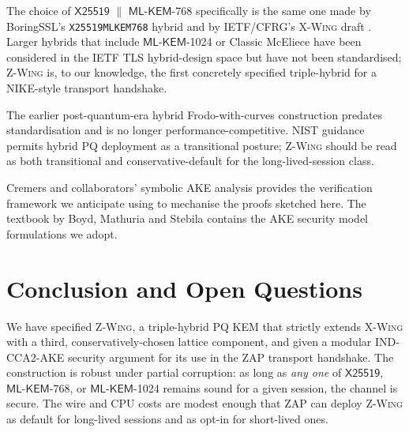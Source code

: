 \documentclass[11pt,a4paper]{article}
\theoremstyle{definition}
\theoremstyle{remark}
\newcommand{\xwing}{\textsc{X-Wing}}
\newcommand{\zwing}{\textsc{Z-Wing}}
\newcommand{\zap}{\textsc{ZAP}}
\newcommand{\mlkem}{\ensuremath{\mathsf{ML\text{-}KEM}}}
\newcommand{\xtf}{\ensuremath{\mathsf{X25519}}}
\begin{document}
The choice of \xtf{} $\parallel$ \mlkem{}-768 specifically is the same one
made by BoringSSL's \texttt{X25519MLKEM768} hybrid \cite{boringssl_xmlkem}
and by IETF/CFRG's \xwing{} draft \cite{xwing2024}. Larger
hybrids that include \mlkem{}-1024 or Classic McEliece have been considered in
the IETF TLS hybrid-design space but have not been standardised; \zwing{} is,
to our knowledge, the first concretely specified triple-hybrid for a
NIKE-style transport handshake.

The earlier post-quantum-era hybrid Frodo-with-curves construction
\cite{bos2015hybrid} predates standardisation and is no longer
performance-competitive. NIST guidance \cite{nistsp800208,nistpqc} permits
hybrid PQ deployment as a transitional posture; \zwing{} should be read as
both transitional and conservative-default for the long-lived-session class.

Cremers and collaborators' symbolic AKE analysis \cite{cremers2009ake,cremers2017ake,tamarin}
provides the verification framework we anticipate using to mechanise the
proofs sketched here. The textbook by Boyd, Mathuria and Stebila
\cite{boyd2020ake} contains the AKE security model formulations we adopt.

\section{Conclusion and Open Questions}\label{sec:conclusion}

We have specified \zwing{}, a triple-hybrid PQ KEM that strictly extends
\xwing{} with a third, conservatively-chosen lattice component, and given a
modular IND-CCA2-AKE security argument for its use in the \zap{} transport
handshake. The construction is robust under partial corruption: as long as
\emph{any one} of $\xtf$, \mlkem{}-768, or \mlkem{}-1024 remains sound for a
given session, the channel is secure. The wire and CPU costs are modest enough
that \zap{} can deploy \zwing{} as default for long-lived sessions and as
opt-in for short-lived ones.
\end{document}
